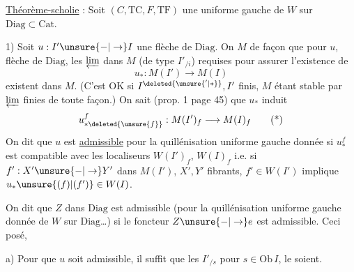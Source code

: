\uline{Théorème-scholie} : Soit $(C,\mathrm{TC},F,\mathrm{TF})$ une  uniforme gauche de $W$ sur $\mathrm{Diag}\subset\mathrm{Cat}$.

1) Soit $u:I'\unsure{-|\to}I$ une flèche de $\mathrm{Diag}$. On    $M$ de façon que pour $u$, flèche de $\mathrm{Diag}$, les $\varprojlim$ dans $M$  (de type $I'_{/i}$) requises pour assurer l'existence de
\[
u_*:M(I')\longrightarrow M(I)
\]
existent dans $M$. (C'est OK si $I^{\deleted{\unsure{'|*}}},I'$ finis, $M$ étant  stable par $\varprojlim$ finies de toute façon.) On sait (prop. 1 page 45) que $u_*$ induit
\[
u^{f}_{*\deleted{\unsure{f}}}:M(I')_f\longrightarrow M(I)_f
\tag*{(*)}
\]
On dit que $u$ est \uline{admissible}  pour la quillénisation uniforme gauche donnée  si $u^f_*$ est compatible avec les localiseurs $W(I')_f$, $W(I)_f$ i.e. si $f':X'\unsure{-|\to}Y'$ dans $M(I')$, $X',Y'$ \deleted{$\unsure{\in}$} fibrants, $f'\in W(I')$ implique $u_*\unsure{(f)|(f')}\in W(I)$.

On dit que $Z$ dans $\mathrm{Diag}$ est admissible (pour la quillénisation uniforme gauche donnée de $W$ sur $\mathrm{Diag}$\ldots) si le foncteur $Z\unsure{-|\to}e$ est admissible. Ceci posé,

a) Pour que $u$ soit admissible, il suffit que les $I'_{/s}$ pour $s\in\mathrm{Ob}\,I$, le soient.
